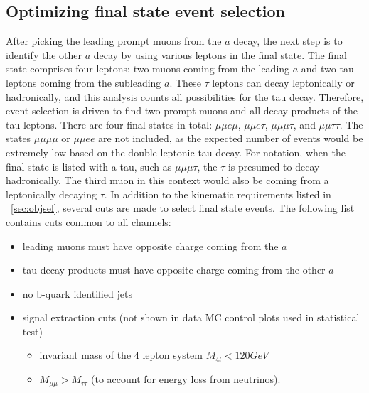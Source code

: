 \subsection{Optimizing final state event selection}
After picking the leading prompt muons from the $a$ decay, the next step is to identify the other $a$ decay by using various leptons in the final state. The final state comprises four leptons: two muons coming from the leading $a$ and two tau leptons coming from the subleading $a$. These $\tau$ leptons can decay leptonically or hadronically, and this analysis counts all possibilities for the tau decay. Therefore, event selection is driven to find two prompt muons and all decay products of the tau leptons. There are four final states in total: $\mu\mu e \mu$, $\mu\mu e \tau$, $\mu\mu\mu\tau$, and $\mu\mu\tau\tau$. 
The states $\mu\mu\mu\mu$ or $\mu\mu e e $ are not included, as the expected number of events would be extremely low based on the double leptonic tau decay. 
For notation, when the final state is listed with a tau, such as $\mu\mu\mu\tau$, the $\tau$ is presumed to decay hadronically. The third muon in this context would also be coming from a leptonically decaying $\tau$.  
In addition to the kinematic requirements listed in ~\ref{sec:objsel}, several cuts are made to select final state events. The following list contains cuts common to all channels:
\begin{itemize}
    \item leading muons must have opposite charge coming from the $a$
    \item tau decay products must have opposite charge coming from the other $a$
    \item no b-quark identified jets 
    \item signal extraction cuts (not shown in data MC control plots used in statistical test)
    \begin{itemize}
    \item invariant mass of the 4 lepton system $M_{4l}<120GeV$ 
    \item $M_{\mu\mu} > M_{\tau\tau}$ (to account for energy loss from neutrinos).
    \end{itemize}
\end{itemize}

